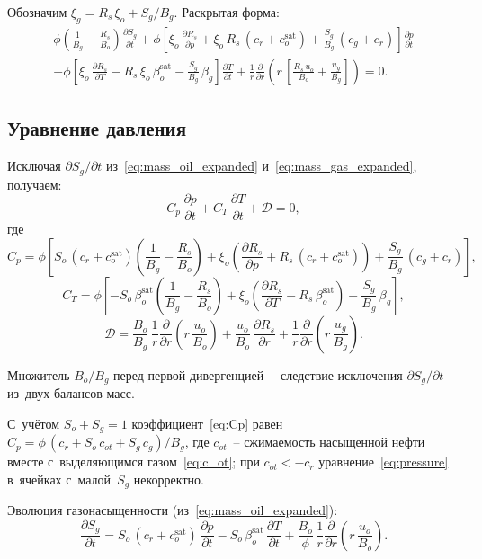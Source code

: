 \documentclass[12pt,a4paper]{article}
\newcommand{\divr}[1]{\frac{1}{r}\frac{\partial}{\partial r}\!\left(r\,#1\right)}
\newcommand{\pdt}[1]{\frac{\partial #1}{\partial t}}
\newcommand{\pdr}[1]{\frac{\partial #1}{\partial r}}
\newcommand{\csat}{c_o^{\mathrm{sat}}}
\newcommand{\bsat}{\beta_o^{\mathrm{sat}}}
\newcommand{\xio}{\xi_o}
\begin{document}
Обозначим $\xi_g = R_s\,\xio + S_g/B_g$. Раскрытая форма:
\begin{multline}\label{eq:mass_gas_expanded}
  \phi\!\left(\frac{1}{B_g} - \frac{R_s}{B_o}\right)
    \pdt{S_g}
  + \phi\!\left[\xio\,\frac{\partial R_s}{\partial p}
    + \xio\,R_s\,(c_r + \csat)
    + \frac{S_g}{B_g}\,(c_g + c_r)\right]
    \pdt{p}
  \\
  + \phi\!\left[\xio\,\frac{\partial R_s}{\partial T}
    - R_s\,\xio\,\bsat
    - \frac{S_g}{B_g}\,\beta_g\right]
    \pdt{T}
  + \divr{\left[
    \frac{R_s\,u_o}{B_o} + \frac{u_g}{B_g}
  \right]} = 0.
\end{multline}


\subsection{Уравнение давления}

Исключая $\partial S_g/\partial t$ из~\eqref{eq:mass_oil_expanded}
и~\eqref{eq:mass_gas_expanded}, получаем:
\begin{equation}\label{eq:pressure}
  C_p\,\pdt{p}
  + C_T\,\pdt{T}
  + \mathcal{D} = 0,
\end{equation}
где
\begin{equation}\label{eq:Cp}
  C_p = \phi\!\left[
    S_o\,(c_r + \csat)\!\left(\frac{1}{B_g} - \frac{R_s}{B_o}\right)
    + \xio\!\left(\frac{\partial R_s}{\partial p}
      + R_s\,(c_r + \csat)\right)
    + \frac{S_g}{B_g}\,(c_g + c_r)
  \right],
\end{equation}
\begin{equation}\label{eq:CT}
  C_T = \phi\!\left[
    -S_o\,\bsat\!\left(\frac{1}{B_g} - \frac{R_s}{B_o}\right)
    + \xio\!\left(\frac{\partial R_s}{\partial T}
      - R_s\,\bsat\right)
    - \frac{S_g}{B_g}\,\beta_g
  \right],
\end{equation}
\begin{equation}\label{eq:D_operator}
  \mathcal{D} = \frac{B_o}{B_g}\,\divr{\frac{u_o}{B_o}}
    + \frac{u_o}{B_o}\,\pdr{R_s}
    + \divr{\frac{u_g}{B_g}}.
\end{equation}

Множитель $B_o/B_g$ перед первой дивергенцией~-- следствие исключения
$\partial S_g/\partial t$ из~двух балансов масс.

С~учётом $S_o + S_g = 1$ коэффициент~\eqref{eq:Cp} равен
$C_p = \phi\,(c_r + S_o\,c_{ot} + S_g\,c_g)/B_g$, где $c_{ot}$~--
сжимаемость насыщенной нефти вместе с~выделяющимся газом~\eqref{eq:c_ot};
при $c_{ot} < -c_r$ уравнение~\eqref{eq:pressure} в~ячейках с~малой~$S_g$
некорректно.

Эволюция газонасыщенности (из~\eqref{eq:mass_oil_expanded}):
\begin{equation}\label{eq:Sg_ode}
  \pdt{S_g}
  = S_o\,(c_r + \csat)\,\pdt{p}
    - S_o\,\bsat\,\pdt{T}
    + \frac{B_o}{\phi}\,\divr{\frac{u_o}{B_o}}.
\end{equation}
\end{document}
